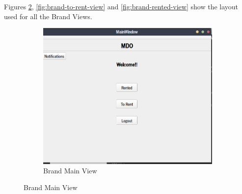 Figures \ref{fig:brand-main-view}, \ref{fig:brand-to-rent-view} and \ref{fig:brand-rented-view} show the layout used for all the Brand Views.

\begin{figure}[htb!]
  \centering
  \begin{subfigure}{.4\textwidth}
  \includegraphics[width=\textwidth]{img/brand-main-view.jpg}%
  \caption{Brand Main View}%
  \label{fig:brand-main-view}
\end{subfigure}


\end{figure}

